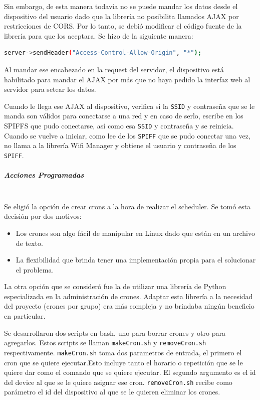 Sin embargo, de esta manera todavía no se puede mandar los datos desde el dispositivo del usuario dado que la librería no posibilita llamados AJAX por restricciones de CORS. Por lo tanto, se debió modificar el código fuente de la librería para que los aceptara. Se hizo de la siguiente manera:

\begin{lstlisting}[language=bash]
server->sendHeader("Access-Control-Allow-Origin", "*");
\end{lstlisting}


Al mandar ese encabezado en la request del servidor, el dispositivo está habilitado para mandar el AJAX por más que no haya pedido la interfaz web al servidor para setear los datos.

Cuando le llega ese AJAX al dispositivo, verifica si la \lstinline[columns=fixed]{SSID} y contraseña que se le manda son válidos para conectarse a una red y en caso de serlo, escribe en los SPIFFS que pudo conectarse, así como esa  \lstinline[columns=fixed]{SSID} y contraseña y  se reinicia. Cuando se vuelve a iniciar, como lee de los \lstinline[columns=fixed]{SPIFF} que se pudo conectar una vez, no llama a la librería Wifi Manager y obtiene el usuario y contraseña de los \lstinline[columns=fixed]{SPIFF}.



\subparagraph{Acciones Programadas}\mbox{}\\

Se eligió la opción de crear crons a la hora de realizar el scheduler. Se tomó esta decisión por dos motivos: 
\begin{itemize}
  \item Los crones son algo fácil de manipular en Linux dado que están en un archivo de texto.
  \item La flexibilidad que brinda tener una implementación propia para el solucionar el problema.
\end{itemize}

La otra opción que se consideró fue la de utilizar una librería de Python especializada en la administración de crones. Adaptar esta librería a la necesidad del proyecto (crones por grupo) era más compleja y no brindaba ningún beneficio en particular.

Se desarrollaron dos scripts en bash, uno para borrar crones y otro para agregarlos. Estos scripts se llaman \lstinline[columns=fixed]{makeCron.sh} y \lstinline[columns=fixed]{removeCron.sh} respectivamente.
\lstinline[columns=fixed]{makeCron.sh} toma dos parametros de entrada, el primero el cron que se quiere ejecutar.Esto incluye tanto el horario o repetición que se le quiere dar como el comando que se quiere ejecutar. El segundo argumento es el id del device al que se le quiere asignar ese cron. 
\lstinline[columns=fixed]{removeCron.sh} recibe como parámetro el id del dispositivo al que se le quieren eliminar los crones.

